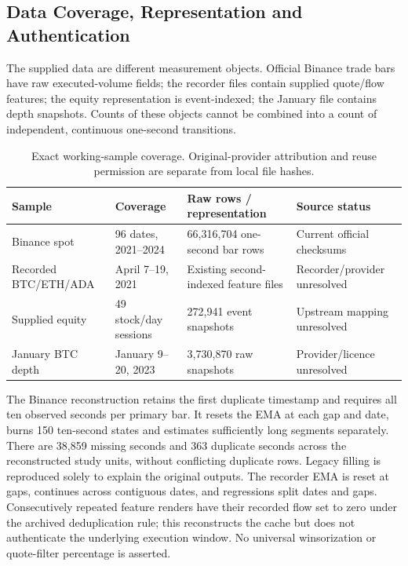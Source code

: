 \subsection{Data Coverage, Representation and Authentication}
The supplied data are different measurement objects. Official Binance trade bars have raw executed-volume fields; the recorder files contain supplied quote/flow features; the equity representation is event-indexed; the January file contains depth snapshots. Counts of these objects cannot be combined into a count of independent, continuous one-second transitions.
\begin{table}[htbp]
\centering\footnotesize\setlength{\tabcolsep}{3pt}
\caption{Exact working-sample coverage. Original-provider attribution and reuse permission are separate from local file hashes.}
\label{tab:datasets}
\begin{tabularx}{\textwidth}{lXXX}\toprule
Sample & Coverage & Raw rows / representation & Source status \\\midrule
Binance spot & 96 dates, 2021--2024 & 66,316,704 one-second bar rows & Current official checksums \\
Recorded BTC/ETH/ADA & April 7--19, 2021 & Existing second-indexed feature files & Recorder/provider unresolved \\
Supplied equity & 49 stock/day sessions & 272,941 event snapshots & Upstream mapping unresolved \\
January BTC depth & January 9--20, 2023 & 3,730,870 raw snapshots & Provider/licence unresolved \\
\bottomrule\end{tabularx}
\end{table}

The Binance reconstruction retains the first duplicate timestamp and requires all ten observed seconds per primary bar. It resets the EMA at each gap and date, burns 150 ten-second states and estimates sufficiently long segments separately. There are 38,859 missing seconds and 363 duplicate seconds across the reconstructed study units, without conflicting duplicate rows. Legacy filling is reproduced solely to explain the original outputs. The recorder EMA is reset at gaps, continues across contiguous dates, and regressions split dates and gaps. Consecutively repeated feature renders have their recorded flow set to zero under the archived deduplication rule; this reconstructs the cache but does not authenticate the underlying execution window. No universal winsorization or quote-filter percentage is asserted.

